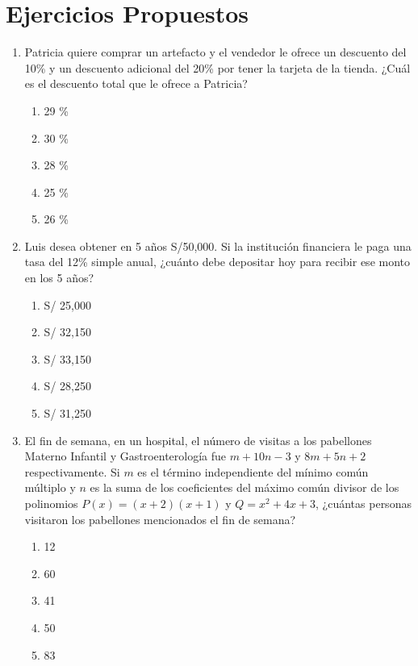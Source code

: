 \newpage

\section*{Ejercicios Propuestos}


\begin{enumerate}
	
	\item Patricia quiere comprar un artefacto y el vendedor le ofrece un descuento del 10\% y un descuento adicional del 20\% por tener la tarjeta de la tienda. ¿Cuál es el descuento total que le ofrece a Patricia?
	\begin{enumerate}[label=\alph*)]
		\item 29 \%
		\item 30 \%
		\item 28 \%
		\item 25 \%
		\item 26 \%
	\end{enumerate}
	
	\item Luis desea obtener en 5 años S/50,000. Si la institución financiera le paga una tasa del 12\% simple anual, ¿cuánto debe depositar hoy para recibir ese monto en los 5 años?
	\begin{enumerate}[label=\alph*)]
		\item S/ 25,000
		\item S/ 32,150
		\item S/ 33,150
		\item S/ 28,250
		\item S/ 31,250
	\end{enumerate}
	
	\item El fin de semana, en un hospital, el número de visitas a los pabellones Materno Infantil y Gastroenterología fue $m+10n-3$ y $8m+5n+2$ respectivamente. Si $m$ es el término independiente del mínimo común múltiplo y $n$ es la suma de los coeficientes del máximo común divisor de los polinomios $P(x)=(x+2)(x+1)$ y $Q=x^2+4x+3$, ¿cuántas personas visitaron los pabellones mencionados el fin de semana?
	\begin{enumerate}[label=\alph*)]
		\item 12
		\item 60
		\item 41
		\item 50
		\item 83
	\end{enumerate}
	

\end{enumerate}
